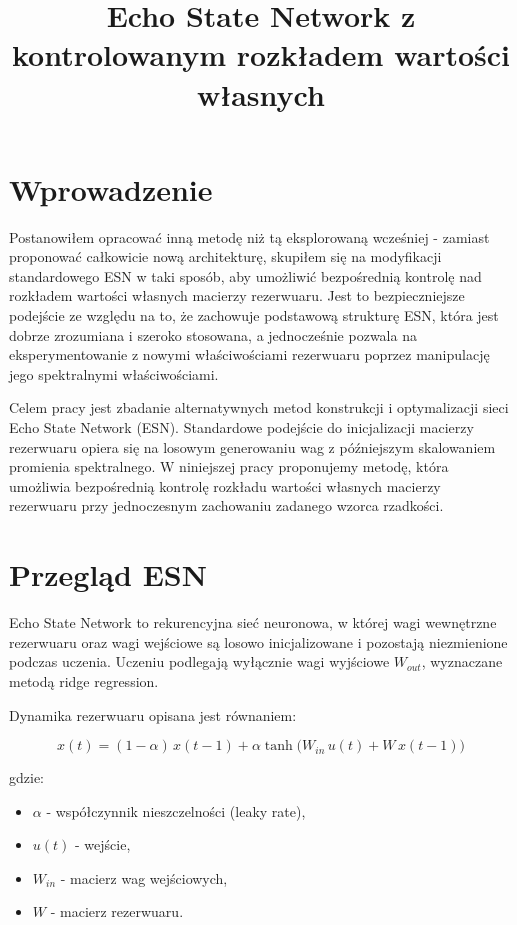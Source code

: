 \documentclass[12pt, a4paper]{article}
\title{Echo State Network z kontrolowanym rozkładem wartości własnych}
\date{}
\begin{document}
\maketitle

\section{Wprowadzenie}

Postanowiłem opracować inną metodę niż tą eksplorowaną wcześniej - zamiast proponować całkowicie nową architekturę, skupiłem się na modyfikacji standardowego ESN w taki sposób, aby umożliwić bezpośrednią kontrolę nad rozkładem wartości własnych macierzy rezerwuaru. Jest to bezpieczniejsze podejście ze względu na to, że zachowuje podstawową strukturę ESN, która jest dobrze zrozumiana i szeroko stosowana, a jednocześnie pozwala na eksperymentowanie z nowymi właściwościami rezerwuaru poprzez manipulację jego spektralnymi właściwościami.

Celem pracy jest zbadanie alternatywnych metod konstrukcji i optymalizacji sieci Echo State Network (ESN). Standardowe podejście do inicjalizacji macierzy rezerwuaru opiera się na losowym generowaniu wag z późniejszym skalowaniem promienia spektralnego. W niniejszej pracy proponujemy metodę, która umożliwia bezpośrednią kontrolę rozkładu wartości własnych macierzy rezerwuaru przy jednoczesnym zachowaniu zadanego wzorca rzadkości.

\section{Przegląd ESN}

Echo State Network to rekurencyjna sieć neuronowa, w której wagi wewnętrzne rezerwuaru oraz wagi wejściowe są losowo inicjalizowane i pozostają niezmienione podczas uczenia. Uczeniu podlegają wyłącznie wagi wyjściowe $W_{out}$, wyznaczane metodą ridge regression.

Dynamika rezerwuaru opisana jest równaniem:

\begin{equation}
    x(t) = (1 - \alpha)\, x(t-1) + \alpha \tanh\!\bigl(W_{in}\, u(t) + W\, x(t-1)\bigr)
\end{equation}

\noindent gdzie:
\begin{itemize}
    \item $\alpha$ - współczynnik nieszczelności (leaky rate),
    \item $u(t)$ - wejście,
    \item $W_{in}$ - macierz wag wejściowych,
    \item $W$ - macierz rezerwuaru.
\end{itemize}
\end{document}
